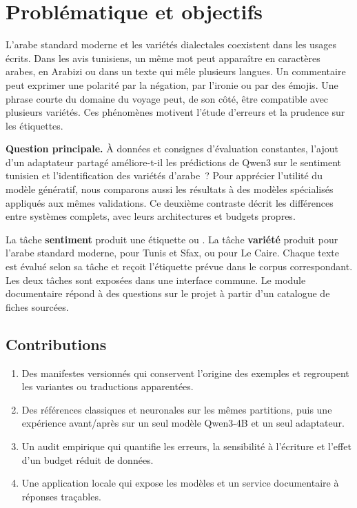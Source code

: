 \section{Problématique et objectifs}\label{sec:question}

L’arabe standard moderne et les variétés dialectales coexistent dans les usages écrits. Dans les avis tunisiens, un même mot peut apparaître en caractères arabes, en Arabizi ou dans un texte qui mêle plusieurs langues. Un commentaire peut exprimer une polarité par la négation, par l’ironie ou par des émojis. Une phrase courte du domaine du voyage peut, de son côté, être compatible avec plusieurs variétés. Ces phénomènes motivent l’étude d’erreurs et la prudence sur les étiquettes.

\textbf{Question principale.} À données et consignes d’évaluation constantes, l’ajout d’un adaptateur partagé améliore-t-il les prédictions de Qwen3 sur le sentiment tunisien et l’identification des variétés d’arabe~? Pour apprécier l’utilité du modèle génératif, nous comparons aussi les résultats à des modèles spécialisés appliqués aux mêmes validations. Ce deuxième contraste décrit les différences entre systèmes complets, avec leurs architectures et budgets propres.

La tâche \textbf{sentiment} produit une étiquette  ou . La tâche \textbf{variété} produit  pour l’arabe standard moderne,  pour Tunis et Sfax, ou  pour Le Caire. Chaque texte est évalué selon sa tâche et reçoit l’étiquette prévue dans le corpus correspondant. Les deux tâches sont exposées dans une interface commune. Le module documentaire répond à des questions sur le projet à partir d’un catalogue de fiches sourcées.

\subsection{Contributions}
\begin{enumerate}
  \item Des manifestes versionnés qui conservent l’origine des exemples et regroupent les variantes ou traductions apparentées.
  \item Des références classiques et neuronales sur les mêmes partitions, puis une expérience avant/après sur un seul modèle Qwen3-4B et un seul adaptateur.
  \item Un audit empirique qui quantifie les erreurs, la sensibilité à l’écriture et l’effet d’un budget réduit de données.
  \item Une application locale qui expose les modèles et un service documentaire à réponses traçables.
\end{enumerate}

